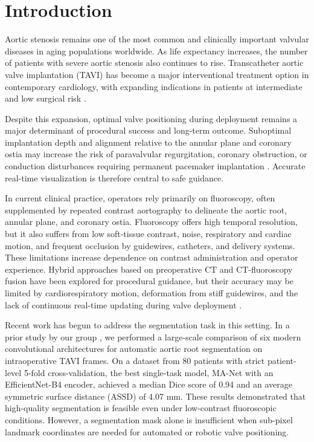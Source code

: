 \documentclass[utf8]{FrontiersinHarvard}
\begin{document}
\section{Introduction}

Aortic stenosis remains one of the most common and clinically important valvular diseases in aging populations worldwide.
As life expectancy increases, the number of patients with severe aortic stenosis also continues to rise.
Transcatheter aortic valve implantation (TAVI) has become a major interventional treatment option in contemporary cardiology, with 
expanding indications in patients at intermediate and low surgical risk \citep{otto2020_guideline,vahanian2021_guidelines,leon2019_partner3}.

Despite this expansion, optimal valve positioning during deployment remains a major determinant of procedural success and long-term outcome.
Suboptimal implantation depth and alignment relative to the annular plane and coronary ostia may increase the risk of paravalvular 
regurgitation, coronary obstruction, or conduction disturbances requiring permanent pacemaker implantation 
\citep{pibarot2021_pvl,jilaihawi2022_coronary,kammler2016_implantdepth}.
Accurate real-time visualization is therefore central to safe guidance.

In current clinical practice, operators rely primarily on fluoroscopy, often supplemented by repeated contrast aortography to delineate the 
aortic root, annular plane, and coronary ostia.
Fluoroscopy offers high temporal resolution, but it also suffers from low soft-tissue contrast, noise, respiratory and cardiac motion, and 
frequent occlusion by guidewires, catheters, and delivery systems.
These limitations increase dependence on contrast administration and operator experience.
Hybrid approaches based on preoperative CT and CT-fluoroscopy fusion have been explored for procedural guidance, but their accuracy may be 
limited by cardiorespiratory motion, deformation from stiff guidewires, and the lack of continuous real-time updating during valve deployment 
\citep{vernikouskaya2017_imageguidance,vernikouskaya2018_registration}.

Recent work has begun to address the segmentation task in this setting.
In a prior study by our group \citep{laptev2025_aorticroot}, we performed a large-scale comparison of six modern convolutional architectures 
for automatic aortic root segmentation on intraoperative TAVI frames.
On a dataset from 80 patients with strict patient-level 5-fold cross-validation, the best single-task model, MA-Net with an EfficientNet-B4 encoder, 
achieved a median Dice score of 0.94 and an average symmetric surface distance (ASSD) of 4.07 mm.
These results demonstrated that high-quality segmentation is feasible even under low-contrast fluoroscopic conditions.
However, a segmentation mask alone is insufficient when sub-pixel landmark coordinates are needed for automated or robotic valve positioning.
\end{document}
